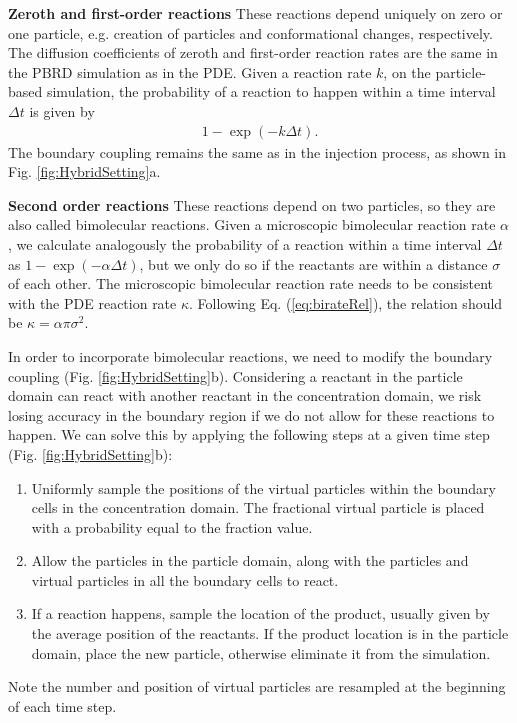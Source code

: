 \documentclass[10pt,twocolumn]{revtex4-1}
\begin{document}
	\textbf{Zeroth and first-order reactions}
	These reactions depend uniquely on zero or one particle, e.g. creation of particles and conformational changes, respectively. The diffusion coefficients of zeroth and first-order reaction rates are the same in the PBRD simulation as in the PDE. Given a reaction rate $k$, on the particle-based simulation, the probability of a reaction to happen within a time interval $\Delta t$ is given by
	\begin{align}
	1-\exp (-k\Delta t).
	\label{eq:probReact}
	\end{align}
	The boundary coupling remains the same as in the injection process, as shown in Fig. \ref{fig:HybridSetting}a.
	
	\textbf{Second order reactions}
	These reactions depend on two particles, so they are also called bimolecular reactions. Given a microscopic bimolecular reaction rate $\alpha$, we calculate analogously the probability of a reaction within a time interval $\Delta t$ as $1-\exp (-\alpha\Delta t)$, but we only do so if the reactants are within a distance $\sigma$ of each other. The microscopic bimolecular reaction rate needs to be consistent with the PDE reaction rate $\kappa$. Following Eq. (\ref{eq:birateRel}), the relation should be $\kappa = \alpha \pi \sigma^2$. 
	
	In order to incorporate bimolecular reactions, we need to modify the boundary coupling (Fig. \ref{fig:HybridSetting}b). Considering a reactant in the particle domain can react with another reactant in the concentration domain, we risk losing accuracy in the boundary region if we do not allow for these reactions to happen. We can solve this by applying the following steps at a given time step (Fig. \ref{fig:HybridSetting}b):
	\begin{enumerate}
		\item Uniformly sample the positions of the virtual particles within the boundary cells in the concentration domain. The fractional virtual particle is placed with a probability equal to the fraction value.
		\item Allow the particles in the particle domain, along with the particles and virtual particles in all the boundary cells to react.
		\item If a reaction happens, sample the location of the product, usually given by the average position of the reactants. If the product location is in the particle domain, place the new particle, otherwise eliminate it from the simulation. 
	\end{enumerate}
	Note the number and position of virtual particles are resampled at the beginning of each time step.
	
\end{document}
